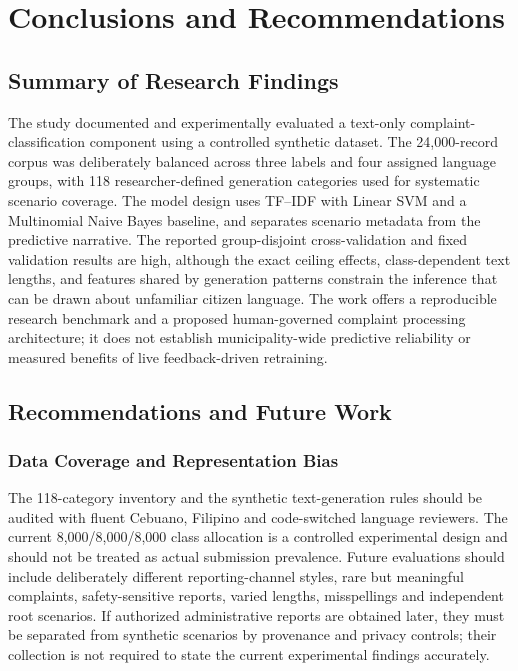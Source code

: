 \chapter{Conclusions and Recommendations}
\section{Summary of Research Findings}
The study documented and experimentally evaluated a text-only complaint-classification component using a controlled synthetic dataset. The 24,000-record corpus was deliberately balanced across three labels and four assigned language groups, with 118 researcher-defined generation categories used for systematic scenario coverage. The model design uses TF--IDF with Linear SVM and a Multinomial Naive Bayes baseline, and separates scenario metadata from the predictive narrative. The reported group-disjoint cross-validation and fixed validation results are high, although the exact ceiling effects, class-dependent text lengths, and features shared by generation patterns constrain the inference that can be drawn about unfamiliar citizen language. The work offers a reproducible research benchmark and a proposed human-governed complaint processing architecture; it does not establish municipality-wide predictive reliability or measured benefits of live feedback-driven retraining.

\section{Recommendations and Future Work}
\subsection{Data Coverage and Representation Bias}
The 118-category inventory and the synthetic text-generation rules should be audited with fluent Cebuano, Filipino and code-switched language reviewers. The current 8,000/8,000/8,000 class allocation is a controlled experimental design and should not be treated as actual submission prevalence. Future evaluations should include deliberately different reporting-channel styles, rare but meaningful complaints, safety-sensitive reports, varied lengths, misspellings and independent root scenarios. If authorized administrative reports are obtained later, they must be separated from synthetic scenarios by provenance and privacy controls; their collection is not required to state the current experimental findings accurately.

